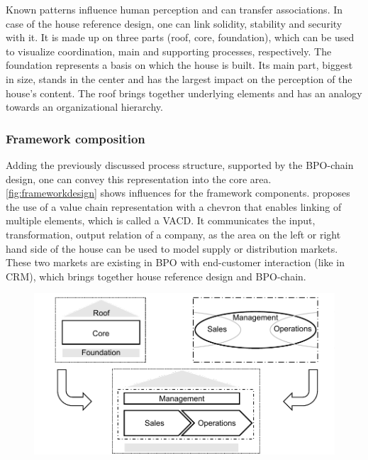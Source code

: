 	Known patterns influence human perception \citep{kroeber1997} and can transfer associations. In case of the house reference design, one can link solidity, stability and security \citep[]{Meise2001} with it. It is made up on three parts (\viz roof, core, foundation), which can be used to visualize coordination, main and supporting processes, respectively. The foundation represents a basis on which the house is built. Its main part, biggest in size, stands in the center and has the largest impact on the perception of the house's content. The roof brings together underlying elements and has an analogy towards an organizational hierarchy. 
	
	\subsubsection{Framework composition}
	
	Adding the previously discussed process structure, supported by the BPO-chain design, one can convey this representation into the core area. \Fig \ref{fig:frameworkdesign} shows influences for the framework components. 
	\citeauthor{Meise2001} proposes the use of a value chain representation with a chevron that enables linking of multiple elements, which is called a \acrfull{VACD}. It communicates the input, transformation, output relation of a company, as the area on the left or right hand side of the house can be used to model supply or distribution markets. 
	These two markets are existing in BPO with end-customer interaction (like in \acrshort{CRM}), which brings together house reference design and \acrshort{BPO}-chain. 
	
	\begin{figure}[caption={Framework design influences}, label={fig:frameworkdesign}]
		{	\includegraphics[width=.8\textwidth]{figures/frameworkdesign.pdf}}
	\end{figure} 
	
